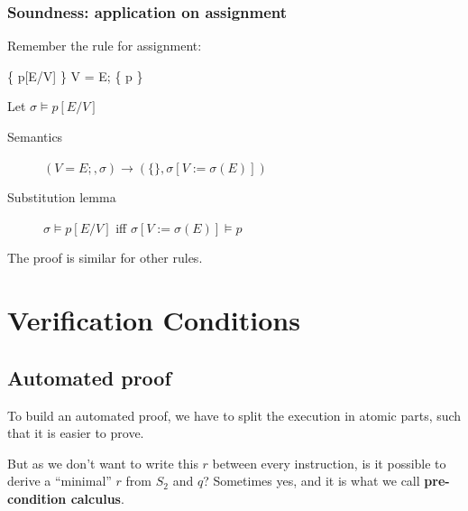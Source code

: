 \documentclass[12pt, a4paper]{book}
\begin{document}
    \subsubsection{Soundness: application on assignment}

    Remember the rule for assignment:

    \begin{center}
        \begin{minipage}{0.4\linewidth}
        \begin{framed}
            \inference{}
            { \{ p[E/V] \} V = E; \{ p \} }
        \end{framed}
        \end{minipage}
    \end{center}

    Let $\sigma \models p[E/V]$

    \begin{description}
        \item[Semantics] $(V = E; , \sigma) \longrightarrow (\{\}, \sigma[V := \sigma(E)]) $
        \item[Substitution lemma] $\sigma \models p[E/V]$ iff $\sigma[V:=\sigma(E)] \models p$
    \end{description}

    The proof is similar for other rules.


  \section{Verification Conditions}
  \label{sec:Verification Conditions}

  \subsection{Automated proof}

  To build an automated proof, we have to split the execution in atomic parts,
  such that it is easier to prove.

  \begin{center}
  \end{center}

  But as we don't want to write this $r$ between every instruction, is it
  possible to derive a \enquote{minimal} $r$ from ${S}_{2}$ and $q$? Sometimes
  yes, and it is what we call \textbf{pre-condition calculus}. \newline
\end{document}
